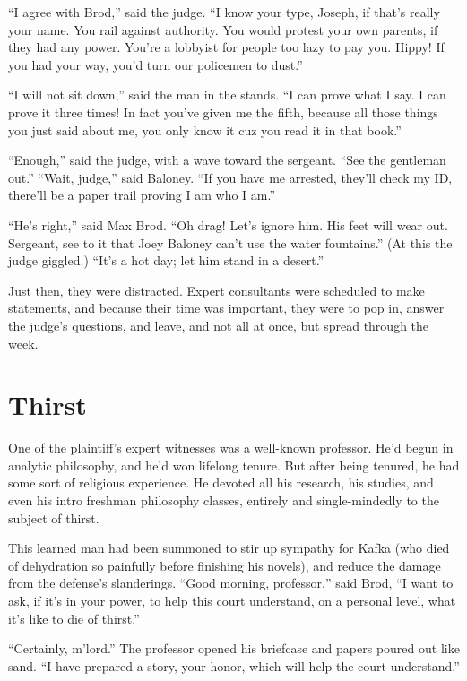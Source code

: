 \documentclass[oneside]{book}
\begin{document}
``I agree with Brod,'' said the judge.  ``I know your type, Joseph, if that's really your name.
You rail against authority.  You would protest your own parents, if they had any power.
You're a lobbyist for people too lazy to pay you.
Hippy!  If you had your way, you'd turn our policemen to dust.''

``I will not sit down,'' said the man in the stands.  ``I can prove what I say.
I can prove it three times!  In fact you've given me the fifth, because all those
things you just said about me, you only know it cuz you read it in that book.''

``Enough,'' said the judge, with a wave toward the sergeant.
``See the gentleman out.''  ``Wait, judge,'' said Baloney.  ``If you have me
arrested, they'll check my ID, there'll be a paper trail proving I am who I am.''

``He's right,'' said Max Brod.  ``Oh drag!  Let's ignore him.  His feet will
wear out.  Sergeant, see to it that Joey Baloney can't use the water fountains.''
(At this the judge giggled.)  ``It's a hot day; let him stand in a desert.''

Just then, they were distracted.
Expert consultants were scheduled to make statements, and because their time
was important, they were to pop in, answer the judge's questions, and leave,
and not all at once, but spread through the week.

\chapter{Thirst}

One of the plaintiff's expert witnesses was a well-known professor.
He'd begun in analytic philosophy, and he'd won lifelong tenure.  But
after being tenured, he had some sort of religious experience.  He devoted
all his research, his studies, and even his intro freshman philosophy classes, 
entirely and single-mindedly to the subject of thirst.

This learned man had been summoned to stir
up sympathy for Kafka (who died of dehydration so painfully before finishing his novels),
and reduce the damage from the defense's slanderings.
``Good morning, professor,'' said Brod, ``I want to ask, if it's in your power, to
help this court understand, on a personal level, what it's like to die of thirst.''

``Certainly, m'lord.''  The professor opened his briefcase and papers poured out like sand.  ``I have prepared a story, your honor, which will help
the court understand.''
\end{document}

